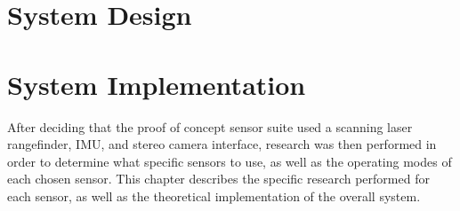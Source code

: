 \documentclass[12pt]{article}
\begin{document}

\newpage

\doublespacing

\tableofcontents %
\newpage

\begin{small} %
\listoffigures %
\end{small}
\newpage 



\newpage
\newpage
{} %


\newpage

\newpage
\section{System Design}


\newpage
\section{System Implementation}
After deciding that the proof of concept sensor suite used a scanning laser rangefinder, IMU, and stereo camera interface, research was then performed in order to determine what specific sensors to use, as well as the operating modes of each chosen sensor. This chapter describes the specific research performed for each sensor, as well as the theoretical implementation of the overall system.














\end{document}
